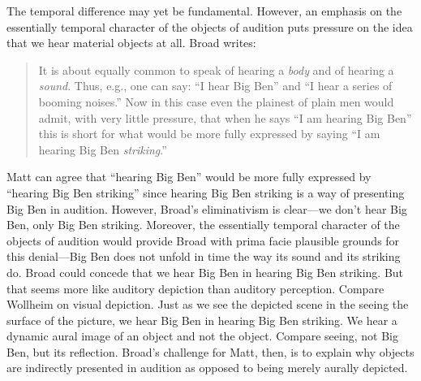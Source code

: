 \documentclass[12pt]{article}
\begin{document}
The temporal difference may yet be fundamental. However, an emphasis on the essentially temporal character of the objects of audition puts pressure on the idea that we hear material objects at all. Broad writes:
\begin{quote}
    It is about equally common to speak of hearing a \emph{body} and of hearing a \emph{sound}. Thus, e.g., one can say: ``I hear Big Ben'' and ``I hear a series of booming noises.'' Now in this case even the plainest of plain men would admit, with very little pressure, that when he says ``I am hearing Big Ben'' this is short for what would be more fully expressed by saying ``I am hearing Big Ben \emph{striking}.''
\end{quote}
Matt can agree that ``hearing Big Ben'' would be more fully expressed by ``hearing Big Ben striking'' since hearing Big Ben striking is a way of presenting Big Ben in audition. However, Broad's eliminativism is clear---we don't hear Big Ben, only Big Ben striking. Moreover, the essentially temporal character of the objects of audition would provide Broad with prima facie plausible grounds for this denial---Big Ben does not unfold in time the way its sound and its striking do. Broad could concede that we hear Big Ben in hearing Big Ben striking. But that seems more like auditory depiction than auditory perception. Compare Wollheim on visual depiction. Just as we see the depicted scene in the seeing the surface of the picture, we hear Big Ben in hearing Big Ben striking. We hear a dynamic aural image of an object and not the object. Compare seeing, not Big Ben, but its reflection. Broad's challenge for Matt, then, is to explain why objects are indirectly presented in audition as opposed to being merely aurally depicted.



 
 
\end{document}
